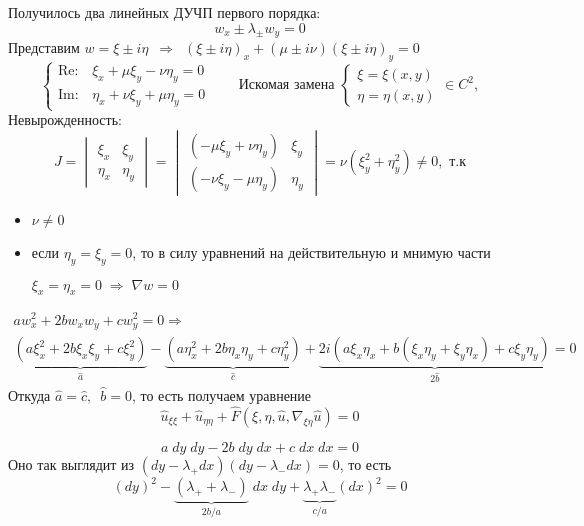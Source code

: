 \documentclass[../main.tex]{subfiles}
\begin{document}
Получилось два линейных ДУЧП первого порядка: 
$$w_x \pm \lambda_\pm w_y = 0 $$
%
Представим $w = \xi \pm i\eta 
\;\ \Rightarrow\;\ 
(\xi \pm i\eta)_x + (\mu \pm i\nu)(\xi \pm i\eta)_y = 0 $
%
$$
\begin{cases}
    \mathrm{Re:} & \xi_x  + \mu\xi_y - \nu\eta_y = 0 \\
    \mathrm{Im:} & \eta_x + \nu\xi_y + \mu\eta_y = 0
\end{cases}
\qquad \text{Искомая замена }
\begin{cases}
    \xi  = \xi (x, y) \\
    \eta = \eta(x, y)
\end{cases} \in C^2,
$$
Невырожденность:
$$ J = 
\begin{vmatrix}
    \xi_x  & \xi_y \\
    \eta_x & \eta_y
\end{vmatrix} =
\begin{vmatrix}
    (-\mu\xi_y + \nu\eta_y) & \xi_y \\
    (-\nu\xi_y - \mu\eta_y) & \eta_y
\end{vmatrix} =
\nu (\xi_y^2 + \eta_y^2) \neq 0,
\text{ т.к} $$
\begin{itemize}[nolistsep]

\item $\nu \neq 0$

\item если $\eta_y = \xi_y = 0$, то в силу уравнений на действительную и мнимую части
    
$\xi_x = \eta_x = 0 \; \Rightarrow \; \nabla w = 0$

\end{itemize}
%
\begin{multline*}
a w_x^2 + 2bw_x w_y + c w_y^2 = 0 \Rightarrow \\
%
\underbrace{(a\xi^2_x + 2b\xi_x\xi_y + c\xi_y^2)}_{\hat a} -
\underbrace{(a\eta_x^2 + 2b\eta_x\eta_y + c\eta_y^2)}_{\hat c} + 
\underbrace{2i(a\xi_x \eta_x + b(\xi_x\eta_y + \xi_y\eta_x) + c\xi_y\eta_y)}_{2\hat b} = 0
\end{multline*}
%
Откуда $\hat a = \hat c,\;\ \hat b = 0$, то есть получаем уравнение
$$
\hat u_{\xi\xi} + \hat u_{\eta\eta} 
+ \hat F(\xi, \eta, \hat u, \nabla_{\xi\eta}\hat u) = 0
$$



$$
a\;dy\;dy - 2b\;dy\;dx + c\;dx\;dx =0
$$
Оно так выглядит из $(dy - \lambda_+dx)(dy - \lambda_-dx)=0$, то есть 
$$
(dy)^2 
- \underbrace{(\lambda_{+} + \lambda_{-})}_{2b/a}\;dx\;dy 
+ \underbrace{ \lambda_{+}   \lambda_{-} }_{c/a} (dx)^2 
= 0
$$
\end{document}
